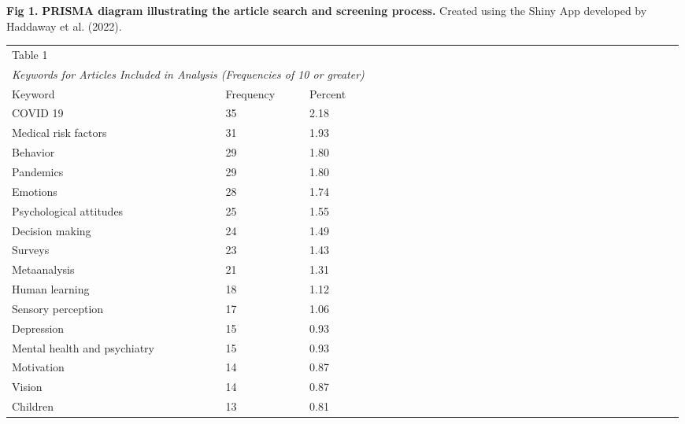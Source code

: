 \documentclass[authordate, empirical]{jote-new-article}
\begin{document}
	\textbf{Fig 1.}\emph{\textbf{ }}\textbf{PRISMA diagram illustrating the article search and screening process.} Created using the Shiny App developed by Haddaway et al. (2022).

	\begin{table}
		\begin{tabularx}{\linewidth}{@{} l l l l l l l l l l l l l l l l l l l l l l l l l l l l l l l @{}}

			Table 1 &  &  \\

			 \multicolumn{3}{l}{\emph{Keywords for Articles Included in Analysis (Frequencies of 10 or greater)}}
			\\

			 Keyword & Frequency & Percent \\

			 COVID 19 & 35 & 2.18 \\

			 Medical risk factors & 31 & 1.93 \\

			 Behavior & 29 & 1.80 \\

			 Pandemics & 29 & 1.80 \\

			 Emotions & 28 & 1.74 \\

			 Psychological attitudes & 25 & 1.55 \\

			 Decision making & 24 & 1.49 \\

			 Surveys & 23 & 1.43 \\

			 Metaanalysis & 21 & 1.31 \\

			 Human learning & 18 & 1.12 \\

			 Sensory perception & 17 & 1.06 \\

			 Depression & 15 & 0.93 \\

			 Mental health and psychiatry & 15 & 0.93 \\

			 Motivation & 14 & 0.87 \\

			 Vision & 14 & 0.87 \\

			 Children & 13 & 0.81 \\


\end{tabularx}
\end{table}
\end{document}
